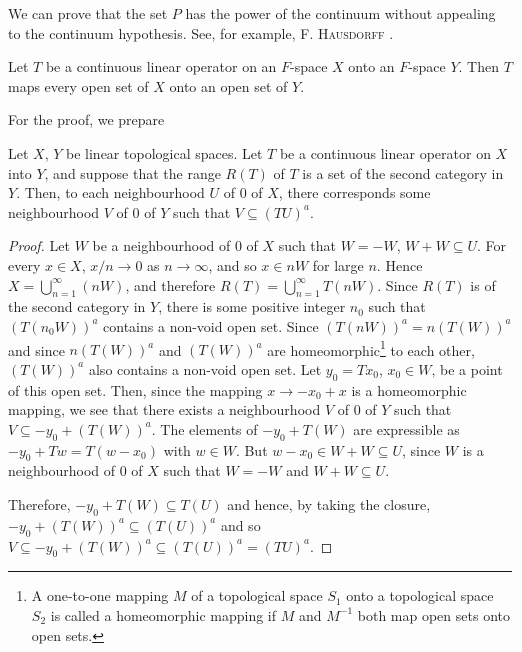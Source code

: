 \begin{remarku} We can prove that the set $P$ has the power of the continuum without appealing to the continuum hypothesis. See, for example, F. \textsc{Hausdorff} \cite{halmos94}. 
\end{remarku}


\label{sec:II.5}

\begin{theoremn} Let $T$ be a continuous linear operator on an $F$-space $X$ onto an $F$-space $Y$. Then $T$ maps every open set of $X$ onto an open set of $Y$.

For the proof, we prepare 

\end{theoremn}
\begin{propositionu} Let $X$, $Y$ be linear topological spaces. Let $T$ be a continuous linear operator on $X$ into $Y$, and suppose that the range $R(T)$ of $T$ is a set of the second category in $Y$. Then, to each neighbourhood $U$ of $0$ of $X$, there corresponds some neighbourhood $V$ of $0$ of $Y$ such that $V \subseteq (TU)^{a}$. 
\end{propositionu}

\begin{proof}
 Let $W$ be a neighbourhood of $0$ of $X$ such that $W = -W$, $W + W \subseteq U$. For every $x \in X$, $x / n \to 0$ as $n \to \infty$, and so $x \in nW$ for large $n$. Hence $X = \bigcup\limits_{n=1}^{\infty}(nW)$, and therefore $R(T) = \bigcup\limits_{n=1}^{\infty} T(nW)$. Since $R(T)$ is of the second category in $Y$, there is some positive integer $n_0$ such that $(T(n_0W))^a$ contains a non-void open set. Since $(T(nW))^a = n(T(W))^a$ and since $n(T(W))^a$ and $(T(W))^a$ are homeomorphic\footnote{A one-to-one mapping $M$ of a topological space $S_{1}$ onto a topological space $S_{2}$ is called a homeomorphic mapping if $M$ and $M^{-1}$ both map open sets onto open sets.} to each other, $(T(W))^a$ also contains a non-void open set. Let $y_0 = Tx_0$, $x_0 \in W$, be a point of this open set. Then, since the mapping $x \to -x_0 + x$ is a homeomorphic mapping, we see that there exists a neighbourhood $V$ of $0$ of $Y$ such that $V \subseteq -y_0 + (T(W))^a$. The elements of $-y_0 + T(W)$ are expressible as $-y_0 + Tw = T(w - x_0)$ with $w \in W$. But $w - x_0 \in W + W \subseteq U$, since $W$ is a neighbourhood of $0$ of $X$ such that $W = -W$ and $W + W \subseteq U$. 

Therefore, $-y_0 + T(W) \subseteq T(U)$ and hence, by taking the closure, $-y_0 + (T(W))^a \subseteq (T(U))^a$ and so $V \subseteq -y_0 + (T(W))^a \subseteq (T(U))^a = (TU)^a$. 
\end{proof}

